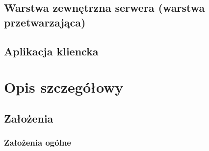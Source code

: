 \par{}

\subsection*[Warstwa zewnętrzna serwera]{Warstwa zewnętrzna serwera (warstwa przetwarzająca)}

\par{}

\subsection*[Aplikacja kliencka]{Aplikacja kliencka}

\par{}

\section[Opis szczegółowy]{Opis szczegółowy}

\subsection[Założenia]{Założenia}

\subsubsection*[Założenia ogólne]{Założenia ogólne} \label{z:o}

